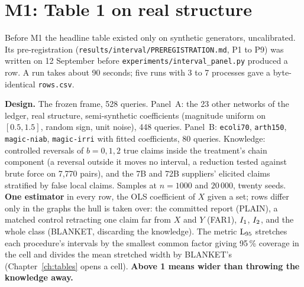 \begin{antes}
\end{antes}

\section{M1: Table 1 on real structure}

Before M1 the headline table existed only on synthetic generators, uncalibrated. Its
pre-registration (\texttt{results/interval/PREREGISTRATION.md}, P1 to P9) was written on 12 September
before \texttt{experiments/interval\_panel.py} produced a row. A run takes about 90 seconds; five runs
with 3 to 7 processes gave a byte-identical \texttt{rows.csv}.

\textbf{Design.} The frozen frame, 528 queries. Panel~A: the 23 other networks of the ledger, real
structure, semi-synthetic coefficients (magnitude uniform on $[0.5, 1.5]$, random sign, unit noise),
448 queries. Panel~B: \texttt{ecoli70}, \texttt{arth150}, \texttt{magic-niab}, \texttt{magic-irri}
with fitted coefficients, 80 queries. Knowledge: controlled reversals of $b = 0, 1, 2$ true claims
inside the treatment's chain component (a reversal outside it moves no interval, a reduction tested
against brute force on 7,770 pairs), and the 7B and 72B suppliers' elicited claims stratified by false
local claims. Samples at $n = 1000$ and $20\,000$, twenty seeds. \textbf{One estimator} in every row,
the OLS coefficient of $X$ given a set; rows differ only in the graphs the hull is taken over: the
committed report (PLAIN), a matched control retracting one claim far from $X$ and $Y$ (FAR1),
$I_{1}$, $I_{2}$, and the whole class (BLANKET, discarding the knowledge). The metric $\mathrm{L}_{95}$
stretches each procedure's intervals by the smallest common factor giving 95\,\% coverage in the cell
and divides the mean stretched width by BLANKET's (Chapter~\ref{ch:tables} opens a cell).
\textbf{Above 1 means wider than throwing the knowledge away.}

